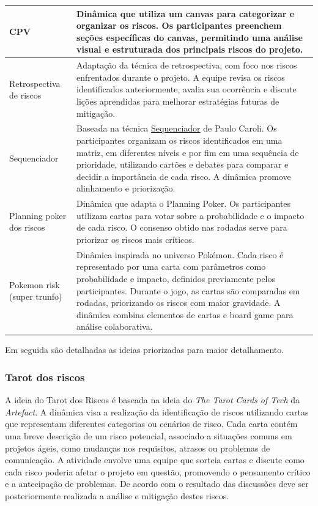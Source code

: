 \documentclass[
	12pt,
	openright,
	twoside,
	a4paper,
	english,
	brazil
	]{abntex2}
\begin{document}
\begin{longtable}{|p{3cm}|p{12cm}|}
  CPV & Dinâmica que utiliza um canvas para categorizar e organizar os riscos. Os participantes preenchem seções específicas do canvas, permitindo uma análise visual e estruturada dos principais riscos do projeto. \\ \hline
  Retrospectiva de riscos & Adaptação da técnica de retrospectiva, com foco nos riscos enfrentados durante o projeto. A equipe revisa os riscos identificados anteriormente, avalia sua ocorrência e discute lições aprendidas para melhorar estratégias futuras de mitigação. \\ \hline
  Sequenciador & Baseada na técnica \href{https://caroli.org/sequenciador/}{Sequenciador} de Paulo Caroli. Os participantes organizam os riscos identificados em uma matriz, em diferentes níveis e por fim em uma sequência de prioridade, utilizando cartões e debates para comparar e decidir a importância de cada risco. A dinâmica promove alinhamento e priorização. \\ \hline
  Planning poker dos riscos & Dinâmica que adapta o Planning Poker. Os participantes utilizam cartas para votar sobre a probabilidade e o impacto de cada risco. O consenso obtido nas rodadas serve para priorizar os riscos mais críticos. \\ \hline
  Pokemon risk (super trunfo) & Dinâmica inspirada no universo Pokémon. Cada risco é representado por uma carta com parâmetros como probabilidade e impacto, definidos previamente pelos participantes. Durante o jogo, as cartas são comparadas em rodadas, priorizando os riscos com maior gravidade. A dinâmica combina elementos de cartas e board game para análise colaborativa. \\ \hline
\end{longtable}

Em seguida são detalhadas as ideias priorizadas para maior detalhamento.

\subsubsection{Tarot dos riscos}

A ideia do Tarot dos Riscos é baseada na ideia do \textit{The Tarot Cards of Tech} da \textit{Artefact}. A dinâmica visa a realização da identificação de riscos utilizando cartas que representam diferentes categorias ou cenários de risco. Cada carta contém uma breve descrição de um risco potencial, associado a situações comuns em projetos ágeis, como mudanças nos requisitos, atrasos ou problemas de comunicação. A atividade envolve uma equipe que sorteia cartas e discute como cada risco poderia afetar o projeto em questão, promovendo o pensamento crítico e a antecipação de problemas. De acordo com o resultado das discussões deve ser posteriormente realizada a análise e mitigação destes riscos.
\end{document}
